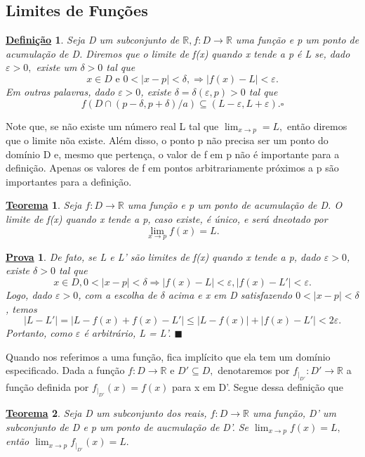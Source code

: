 \documentclass{article}
\newtheorem*{def*}{\underline{Defini\c c\~ao}}
\newtheorem*{theorem*}{\underline{Teorema}}
\newtheorem*{proof*}{\underline{Prova}}
\renewcommand\qedsymbol{$\blacksquare$}
\begin{document}
\subsection{Limites de Fun\c c\~oes}
 \begin{def*}
   Seja D um subconjunto de $\mathbb{R}, f:D\rightarrow \mathbb{R}$ uma fun\c c\~ao e p um ponto de acumula\c c\~ao de D. Diremos que
  o limite de f(x) quando x tende a p \'e L se, dado $\varepsilon > 0,$ existe um $\delta > 0$ tal que 
    $$
    x\in D\text{ e } 0 < |x-p| < \delta, \Rightarrow |f(x) - L | < \varepsilon.
    $$
    Em outras palavras, dado $\varepsilon > 0$, existe $\delta = \delta(\varepsilon, p) > 0$ tal que 
      $$
        f(D\cap(p-\delta, p+\delta)/a)\subseteq{(L-\varepsilon, L+\varepsilon).} \square
      $$
 \end{def*}
 Note que, se n\~ao existe um n\'umero real L tal que $\lim_{x\to p}= L,$ ent\~ao diremos que o limite n\~oa existe. Al\'em disso,
o ponto p n\~ao precisa ser um ponto do dom\'inio D e, mesmo que perten\c ca, o valor de f em p n\~ao \'e importante para a defini\c c\~ao.
Apenas os valores de f em pontos arbitrariamente pr\'oximos a p s\~ao importantes para a defini\c c\~ao.
\begin{theorem*}
  Seja $f:D\rightarrow \mathbb{R}$ uma fun\c c\~ao e p um ponto de acumula\c c\~ao de D. O limite de f(x) quando x tende a p,
  caso existe, \'e \'unico, e ser\'a dneotado por 
    $$
    \lim_{x\to p}f(x) = L.
    $$
\end{theorem*}
\begin{proof*}
  De fato, se L e L' s\~ao limites de f(x) quando x tende a p, dado $\varepsilon > 0$, existe $\delta > 0$ tal que 
    $$
      x\in D, 0 < |x-p| < \delta \Rightarrow |f(x)- L| < \varepsilon, |f(x) - L'|< \varepsilon.
    $$
    Logo, dado $\varepsilon > 0$, com a escolha de $\delta$ acima e x em D satisfazendo $0 <|x-p|<\delta$, temos 
      $$
        |L - L'| = |L -f(x) + f(x) - L'| \leq{} |L - f(x)| + |f(x) - L'| < 2\varepsilon.
      $$
    Portanto, como $\varepsilon$ \'e arbitr\'ario, L = L'. \qedsymbol
\end{proof*}
  Quando nos referimos a uma fun\c c\~ao, fica impl\'icito que ela tem um dom\'inio especificado. Dada a fun\c c\~ao
  $f:D\rightarrow \mathbb{R}$ e $D'\subseteq{D},$ denotaremos por $f_{|_{D'}}:D'\rightarrow \mathbb{R}$ a fun\c c\~ao
  definida por $f_{|_{D'}}(x) = f(x)$ para x em D'. Segue dessa defini\c c\~ao que 
 \begin{theorem*}
   Seja D um subconjunto dos reais, $f:D\rightarrow \mathbb{R}$ uma fun\c c\~ao, D' um subconjunto de D e p um ponto de aucmula\c c\~ao de D'.
  Se $\lim_{x\to p}f(x) = L,$ ent\~ao $\lim_{x\to p}f_{|_{D'}}(x) = L.$
 \end{theorem*}
\end{document}
